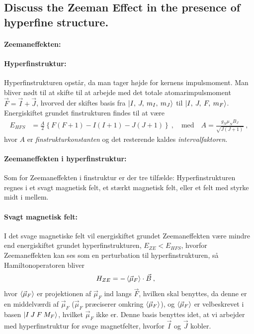 \subsection{Discuss the Zeeman Effect in the presence of hyperfine structure.}


\paragraph{Zeemaneffekten:}


\paragraph{Hyperfinstruktur:} Hyperfinstrukturen opstår, da man tager højde for kernens impulsmoment. Man bliver nødt til at skifte til at arbejde med det totale atomarimpulsmoment $\Vec{F} = \Vec{I} + \Vec{J}$, hvorved der skiftes basis fra $\ket{I,\: J,\: m_I,\: m_J}$ til $\ket{I,\: J,\: F,\: m_F}$. Energiskiftet grundet finstrukturen findes til at være
\begin{align}
    E_{HFS} &= \frac{A}{2}\left\{F(F+1) - I(I+1) - J(J+1)\right\} \: , \quad \text{med} \quad A = \frac{g_N \mu_N B_J}{\sqrt{J(J+1)}} \: ,
\end{align}
hvor $A$ er \emph{finstrukturkonstanten} og det resterende kaldes \emph{intervalfaktoren}.


\paragraph{Zeemaneffekten i hyperfinstruktur:} Som for Zeemaneffekten i finstruktur er der tre tilfælde: Hyperfinstrukturen regnes i et svagt magnetisk felt, et stærkt magnetisk felt, eller et felt med styrke midt i mellem.

\paragraph{Svagt magnetisk felt:} I det svage magnetiske felt vil energiskiftet grundet Zeemaneffekten være mindre end energiskiftet grundet hyperfinstrukturen, $E_{ZE} < E_{HFS}$, hvorfor Zeemaneffekten kan ses som en perturbation til hyperfinstrukturen, så Hamiltonoperatoren bliver
\begin{align}
    H_{ZE} &= - \Braket{\Vec{\mu}_F} \cdot \Vec{B} \: ,
\end{align}
hvor $\Braket{\Vec{\mu}_F}$ er projektionen af $\Vec{\mu}_F$ ind langs $\Vec{F}$, hvilken skal benyttes, da denne er en middelværdi af $\Vec{\mu}_F$ ($\Vec{\mu}_F$ præciserer omkring $\Braket{\Vec{\mu}_F}$), og $\Braket{\Vec{\mu}_F}$ er velbeskrevet i basen $\ket{I \: J \: F \: M_F}$, hvilket $\Vec{\mu}_F$ ikke er. Denne basis benyttes idet, at vi arbejder med hyperfinstruktur for svage magnetfelter, hvorfor $\Vec{I}$ og $\Vec{J}$ kobler.

